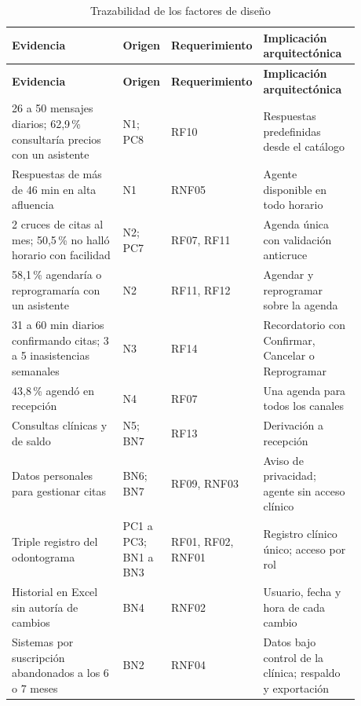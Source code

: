 \begingroup
\fontsize{9}{11}\selectfont
\renewcommand{\arraystretch}{1.2}
\setlength{\LTpre}{0pt}\setlength{\LTpost}{6pt}
\setlength{\tabcolsep}{4pt}
\begin{longtable}{|p{0.33\linewidth}|p{0.13\linewidth}|p{0.14\linewidth}|p{0.28\linewidth}|}
\caption{Trazabilidad de los factores de diseño}
\label{tab:ob2_impulsores} \\
\hline
\textbf{Evidencia} & \textbf{Origen} & \textbf{Requerimiento} & \textbf{Implicación arquitectónica} \\ \hline
\endfirsthead
\hline
\textbf{Evidencia} & \textbf{Origen} & \textbf{Requerimiento} & \textbf{Implicación arquitectónica} \\ \hline
\endhead
26 a 50 mensajes diarios; 62,9\,\% consultaría precios con un asistente & N1; PC8 & RF10 & Respuestas predefinidas desde el catálogo \\ \hline
Respuestas de más de 46 min en alta afluencia & N1 & RNF05 & Agente disponible en todo horario \\ \hline
2 cruces de citas al mes; 50,5\,\% no halló horario con facilidad & N2; PC7 & RF07, RF11 & Agenda única con validación anticruce \\ \hline
58,1\,\% agendaría o reprogramaría con un asistente & N2 & RF11, RF12 & Agendar y reprogramar sobre la agenda \\ \hline
31 a 60 min diarios confirmando citas; 3 a 5 inasistencias semanales & N3 & RF14 & Recordatorio con Confirmar, Cancelar o Reprogramar \\ \hline
43,8\,\% agendó en recepción & N4 & RF07 & Una agenda para todos los canales \\ \hline
Consultas clínicas y de saldo & N5; BN7 & RF13 & Derivación a recepción \\ \hline
Datos personales para gestionar citas & BN6; BN7 & RF09, RNF03 & Aviso de privacidad; agente sin acceso clínico \\ \hline
Triple registro del odontograma & PC1 a PC3; BN1 a BN3 & RF01, RF02, RNF01 & Registro clínico único; acceso por rol \\ \hline
Historial en Excel sin autoría de cambios & BN4 & RNF02 & Usuario, fecha y hora de cada cambio \\ \hline
Sistemas por suscripción abandonados a los 6 o 7 meses & BN2 & RNF04 & Datos bajo control de la clínica; respaldo y exportación \\ \hline
\end{longtable}
\endgroup